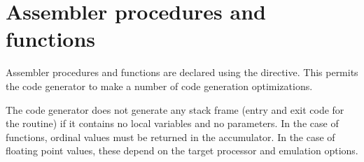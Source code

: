 \section{Assembler procedures and functions}
Assembler procedures and functions are declared using the
 directive.  This permits the code generator to make a number
of code generation optimizations.

The code generator does not generate any stack frame (entry and exit
code for the routine) if it contains no local variables and no
parameters. In the case of functions, ordinal values must be returned
in the accumulator. In the case of floating point values, these depend
on the target processor and emulation options.


%
%
\printindex

